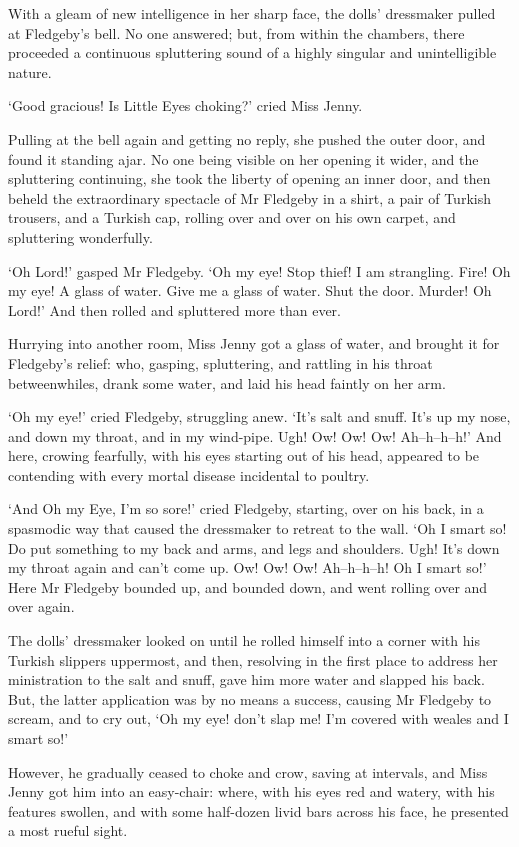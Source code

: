With a gleam of new intelligence in her sharp face, the dolls’
dressmaker pulled at Fledgeby’s bell. No one answered; but, from within
the chambers, there proceeded a continuous spluttering sound of a highly
singular and unintelligible nature.

‘Good gracious! Is Little Eyes choking?’ cried Miss Jenny.

Pulling at the bell again and getting no reply, she pushed the outer
door, and found it standing ajar. No one being visible on her opening it
wider, and the spluttering continuing, she took the liberty of opening
an inner door, and then beheld the extraordinary spectacle of Mr
Fledgeby in a shirt, a pair of Turkish trousers, and a Turkish cap,
rolling over and over on his own carpet, and spluttering wonderfully.

‘Oh Lord!’ gasped Mr Fledgeby. ‘Oh my eye! Stop thief! I am strangling.
Fire! Oh my eye! A glass of water. Give me a glass of water. Shut the
door. Murder! Oh Lord!’ And then rolled and spluttered more than ever.

Hurrying into another room, Miss Jenny got a glass of water, and brought
it for Fledgeby’s relief: who, gasping, spluttering, and rattling in his
throat betweenwhiles, drank some water, and laid his head faintly on her
arm.

‘Oh my eye!’ cried Fledgeby, struggling anew. ‘It’s salt and snuff. It’s
up my nose, and down my throat, and in my wind-pipe. Ugh! Ow! Ow! Ow!
Ah--h--h--h!’ And here, crowing fearfully, with his eyes starting out of
his head, appeared to be contending with every mortal disease incidental
to poultry.

‘And Oh my Eye, I’m so sore!’ cried Fledgeby, starting, over on his
back, in a spasmodic way that caused the dressmaker to retreat to the
wall. ‘Oh I smart so! Do put something to my back and arms, and legs and
shoulders. Ugh! It’s down my throat again and can’t come up. Ow! Ow! Ow!
Ah--h--h--h! Oh I smart so!’ Here Mr Fledgeby bounded up, and bounded
down, and went rolling over and over again.

The dolls’ dressmaker looked on until he rolled himself into a corner
with his Turkish slippers uppermost, and then, resolving in the first
place to address her ministration to the salt and snuff, gave him more
water and slapped his back. But, the latter application was by no means
a success, causing Mr Fledgeby to scream, and to cry out, ‘Oh my eye!
don’t slap me! I’m covered with weales and I smart so!’

However, he gradually ceased to choke and crow, saving at intervals,
and Miss Jenny got him into an easy-chair: where, with his eyes red and
watery, with his features swollen, and with some half-dozen livid bars
across his face, he presented a most rueful sight.

